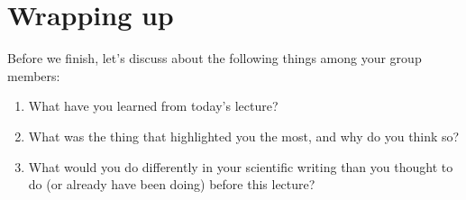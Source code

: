 \documentclass{article}
\begin{document}
\section{Wrapping up}
Before we finish, let's discuss about the following things among your group members:
\begin{enumerate}
    \item What have you learned from today's lecture?
    \vspace{2in}
    \item What was the thing that highlighted you the most, and why do you think so?
    \vspace{2in}
    \item What would you do differently in your scientific writing than you thought to do (or already have been doing) before this lecture?
    \vspace{2in}
\end{enumerate}

\newpage
\
\end{document}
